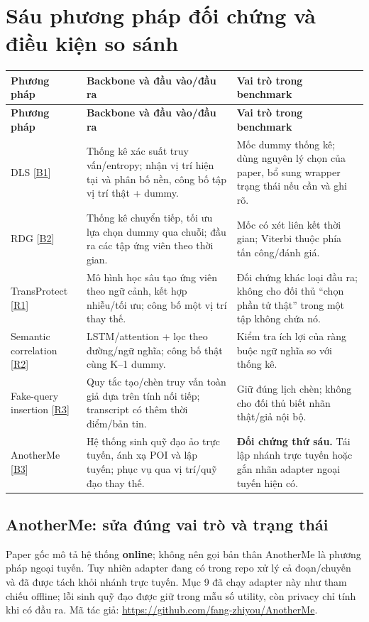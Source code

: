 \documentclass[10pt,a4paper]{article}
\begin{document}
\clearpage
\section{Sáu phương pháp đối chứng và điều kiện so sánh}
\begingroup\small
\begin{longtable}{@{}P{3.643cm}P{6.891cm}P{6.104cm}@{}}
\toprule
\textbf{Phương pháp} & \textbf{Backbone và đầu vào/đầu ra} & \textbf{Vai trò trong benchmark}\\\midrule
\endfirsthead
\toprule
\textbf{Phương pháp} & \textbf{Backbone và đầu vào/đầu ra} & \textbf{Vai trò trong benchmark}\\\midrule
\endhead
\bottomrule\endfoot
DLS [\hyperlink{ref-B1}{B1}] & Thống kê xác suất truy vấn/entropy; nhận vị trí hiện tại và phân bố nền, công bố tập vị trí thật + dummy. & Mốc dummy thống kê; dùng nguyên lý chọn của paper, bổ sung wrapper trạng thái nếu cần và ghi rõ.\\
\addlinespace[3pt]
RDG [\hyperlink{ref-B2}{B2}] & Thống kê chuyển tiếp, tối ưu lựa chọn dummy qua chuỗi; đầu ra các tập ứng viên theo thời gian. & Mốc có xét liên kết thời gian; Viterbi thuộc phía tấn công/đánh giá.\\
\addlinespace[3pt]
TransProtect [\hyperlink{ref-R1}{R1}] & Mô hình học sâu tạo ứng viên theo ngữ cảnh, kết hợp nhiễu/tối ưu; công bố một vị trí thay thế. & Đối chứng khác loại đầu ra; không cho đối thủ “chọn phần tử thật” trong một tập không chứa nó.\\
\addlinespace[3pt]
Semantic correlation [\hyperlink{ref-R2}{R2}] & LSTM/attention + lọc theo đường/ngữ nghĩa; công bố thật cùng K--1 dummy. & Kiểm tra ích lợi của ràng buộc ngữ nghĩa so với thống kê.\\
\addlinespace[3pt]
Fake-query insertion [\hyperlink{ref-R3}{R3}] & Quy tắc tạo/chèn truy vấn toàn giả dựa trên tính nối tiếp; transcript có thêm thời điểm/bản tin. & Giữ đúng lịch chèn; không cho đối thủ biết nhãn thật/giả nội bộ.\\
\addlinespace[3pt]
AnotherMe [\hyperlink{ref-B3}{B3}] & Hệ thống sinh quỹ đạo ảo trực tuyến, ánh xạ POI và lập tuyến; phục vụ qua vị trí/quỹ đạo thay thế. & \textbf{Đối chứng thứ sáu.} Tái lập nhánh trực tuyến hoặc gắn nhãn adapter ngoại tuyến hiện có.\\
\end{longtable}
\endgroup
\subsection{AnotherMe: sửa đúng vai trò và trạng thái}
Paper gốc mô tả hệ thống \textbf{online}; không nên gọi bản thân AnotherMe là phương pháp ngoại tuyến. Tuy nhiên adapter đang có trong repo xử lý cả đoạn/chuyến và đã được tách khỏi nhánh trực tuyến. Mục 9 đã chạy adapter này như tham chiếu offline; lỗi sinh quỹ đạo được giữ trong mẫu số utility, còn privacy chỉ tính khi có đầu ra. Mã tác giả: \url{https://github.com/fang-zhiyou/AnotherMe}.
\end{document}
